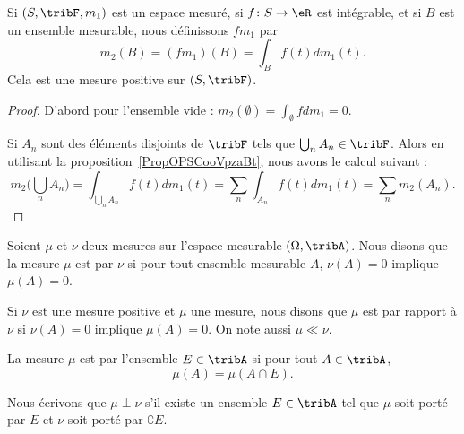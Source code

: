 \begin{proposition}
    Si \( (S,\tribF,m_1)\) est un espace mesuré, si \( f\colon S\to \eR\) est intégrable, et si \( B\) est un ensemble mesurable, nous définissons \( fm_1\) par
    \begin{equation}
        m_2(B)=(fm_1)(B)=\int_Bf(t)dm_1(t).
    \end{equation}
    Cela est une mesure positive sur \( (S,\tribF)\).
\end{proposition}

\begin{proof}
    D'abord pour l'ensemble vide : \( m_2(\emptyset)=\int_{\emptyset}fdm_1=0\).

    Si \( A_n\) sont des éléments disjoints de \( \tribF\) tels que \( \bigcup_nA_n\in\tribF\). Alors en utilisant la proposition~\ref{PropOPSCooVpzaBt}, nous avons le calcul suivant :
    \begin{equation}
        m_2\big( \bigcup_nA_n \big)=\int_{\bigcup_nA_n}f(t)dm_1(t)=\sum_{n}\int_{A_n}f(t)dm_1(t)=\sum_nm_2(A_n).
    \end{equation}
\end{proof}

\begin{definition}
    Soient \( \mu\) et \( \nu\) deux mesures sur l'espace mesurable \( (\Omega,\tribA)\). Nous disons que la mesure \( \mu\) est  par \( \nu\) si pour tout ensemble mesurable \( A\), \( \nu(A)=0\) implique \( \mu(A)=0\).

    Si \( \nu\) est une mesure positive et \( \mu\) une mesure, nous disons que \( \mu\) est  par rapport à \( \nu\) si \( \nu(A)=0\) implique \( \mu(A)=0\). On note aussi \( \mu\ll\nu\).
\end{definition}

La mesure \( \mu\) est  par l'ensemble \( E\in\tribA\) si pour tout \( A\in\tribA\),
\begin{equation}
    \mu(A)=\mu(A\cap E).
\end{equation}

Nous écrivons que \( \mu\perp\nu\) s'il existe un ensemble \( E\in\tribA\) tel que \( \mu\) soit porté par \( E\) et \( \nu\) soit porté par \( \complement E\).

